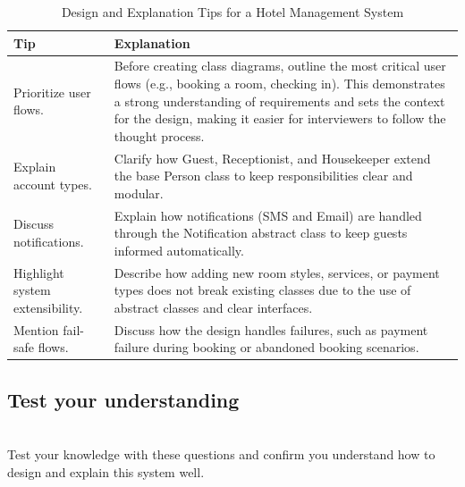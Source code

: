 \begin{table}[h!]
\centering
\begin{tabular}{|p{6cm}|p{9cm}|}
\hline
\textbf{Tip} & \textbf{Explanation} \\
\hline
Prioritize user flows. & 
Before creating class diagrams, outline the most critical user flows (e.g., booking a room, checking in). This demonstrates a strong understanding of requirements and sets the context for the design, making it easier for interviewers to follow the thought process. \\
\hline
Explain account types. & 
Clarify how Guest, Receptionist, and Housekeeper extend the base Person class to keep responsibilities clear and modular. \\
\hline
Discuss notifications. & 
Explain how notifications (SMS and Email) are handled through the Notification abstract class to keep guests informed automatically. \\
\hline
Highlight system extensibility. & 
Describe how adding new room styles, services, or payment types does not break existing classes due to the use of abstract classes and clear interfaces. \\
\hline
Mention fail-safe flows. & 
Discuss how the design handles failures, such as payment failure during booking or abandoned booking scenarios. \\
\hline
\end{tabular}
\caption{Design and Explanation Tips for a Hotel Management System}
\label{tab:hotel_design_tips}
\end{table}


\subsection{Test your understanding}\label{7_dnqls0DZO2dN-d8JZ5n}
\\
Test your knowledge with these questions and confirm you understand how to design and explain this system well.

